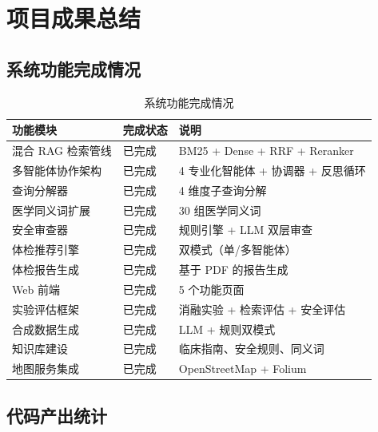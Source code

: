 \documentclass[12pt,a4paper]{article}
\newcommand{\cmark}{\ding{51}}
\begin{document}
\section{项目成果总结}
\label{sec:results}

\subsection{系统功能完成情况}

\begin{table}[H]
    \centering
    \caption{系统功能完成情况}
    \label{tab:status}
    \begin{tabular}{lll}
        \toprule
        \textbf{功能模块} & \textbf{完成状态} & \textbf{说明} \\
        \midrule
        混合 RAG 检索管线 & \cmark 已完成 & BM25 + Dense + RRF + Reranker \\
        多智能体协作架构 & \cmark 已完成 & 4 专业化智能体 + 协调器 + 反思循环 \\
        查询分解器 & \cmark 已完成 & 4 维度子查询分解 \\
        医学同义词扩展 & \cmark 已完成 & 30 组医学同义词 \\
        安全审查器 & \cmark 已完成 & 规则引擎 + LLM 双层审查 \\
        体检推荐引擎 & \cmark 已完成 & 双模式（单/多智能体） \\
        体检报告生成 & \cmark 已完成 & 基于 PDF 的报告生成 \\
        Web 前端 & \cmark 已完成 & 5 个功能页面 \\
        实验评估框架 & \cmark 已完成 & 消融实验 + 检索评估 + 安全评估 \\
        合成数据生成 & \cmark 已完成 & LLM + 规则双模式 \\
        知识库建设 & \cmark 已完成 & 临床指南、安全规则、同义词 \\
        地图服务集成 & \cmark 已完成 & OpenStreetMap + Folium \\
        \bottomrule
    \end{tabular}
\end{table}

\subsection{代码产出统计}
\end{document}
